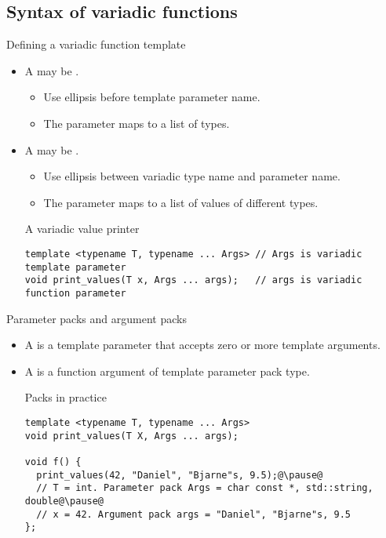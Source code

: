 \subsection{Syntax of variadic functions}

\begin{frame}[t,fragile]{Defining a variadic function template}
\begin{itemize}
  \item A  may be .
    \begin{itemize}
      \item Use ellipsis before template parameter name.
      \item The parameter maps to a list of types.
    \end{itemize}

  \item A  may be .
    \begin{itemize}
      \item Use ellipsis between variadic type name and parameter name.
      \item The parameter maps to a list of values of different types.
    \end{itemize}

\begin{block}{A variadic value printer}
\begin{lstlisting}
template <typename T, typename ... Args> // Args is variadic template parameter
void print_values(T x, Args ... args);   // args is variadic function parameter
\end{lstlisting}
\end{block}

\end{itemize}
\end{frame}

\begin{frame}[t,fragile]{Parameter packs and argument packs}
\begin{itemize}
  \item A  is a template parameter that
        accepts zero or more template arguments.

  \pause
  \item A  is a function argument of
        template parameter pack type.

\pause
\begin{block}{Packs in practice}
\begin{lstlisting}[escapechar=@]
template <typename T, typename ... Args>
void print_values(T X, Args ... args);

void f() {
  print_values(42, "Daniel", "Bjarne"s, 9.5);@\pause@
  // T = int. Parameter pack Args = char const *, std::string, double@\pause@
  // x = 42. Argument pack args = "Daniel", "Bjarne"s, 9.5
};
\end{lstlisting}
\end{block}
\end{itemize}
\end{frame}

